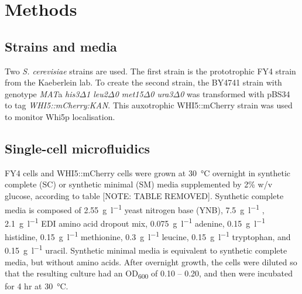 
\chapter{Methods}
\label{ch:methods}

\section{Strains and media}
\label{sec:methods-strains_media}


Two \emph{S. cerevisiae} strains are used.
The first strain is the prototrophic FY4 strain \citep{winstonConstructionSetConvenient1995, brachmannDesignerDeletionStrains1998} from the Kaeberlein lab.
To create the second strain, the BY4741 strain with genotype \emph{MAT}a \emph{his3$\Delta$1 leu2$\Delta$0 met15$\Delta$0 ura3$\Delta$0} \citep{brachmannDesignerDeletionStrains1998} was transformed with pBS34 \citep{haileyFluorescenceResonanceEnergy2002} to tag \emph{WHI5::mCherry:KAN}.
This auxotrophic WHI5::mCherry strain was used to monitor Whi5p localisation.


\section{Single-cell microfluidics}
\label{sec:methods-microfluidics}


FY4 cells and WHI5::mCherry cells were grown at \SI{30}{\celsius} overnight in synthetic complete (SC) or synthetic minimal (SM) media supplemented by 2\% w/v glucose, according to table [NOTE: TABLE REMOVED].
Synthetic complete media is composed of \SI{2.55}{\gram\per\litre} yeast nitrogen base (YNB), \SI{7.5}{\gram\per\litre} , \SI{2.1}{\gram\per\litre} EDI amino acid dropout mix, \SI{0.075}{\gram\per\litre} adenine, \SI{0.15}{\gram\per\litre} histidine, \SI{0.15}{\gram\per\litre} methionine, \SI{0.3}{\gram\per\litre} leucine, \SI{0.15}{\gram\per\litre} tryptophan, and \SI{0.15}{\gram\per\litre} uracil.
Synthetic minimal media is equivalent to synthetic complete media, but without amino acids.
After overnight growth, the cells were diluted so that the resulting culture had an OD\textsubscript{600} of 0.10 -- 0.20, and then were incubated for 4 hr at \SI{30}{\celsius}.


